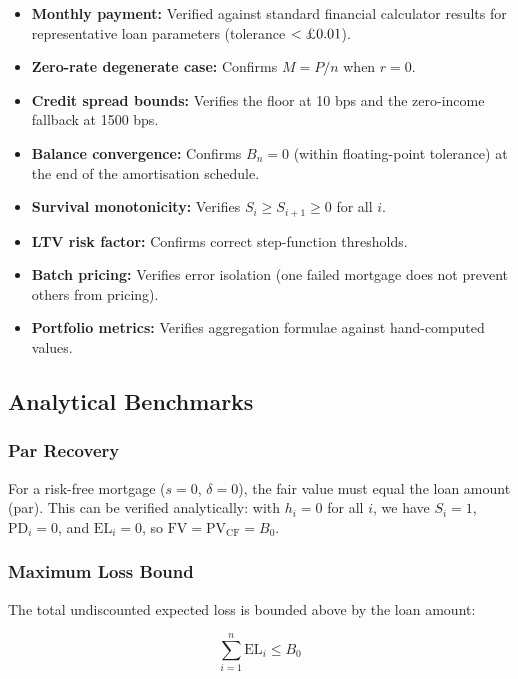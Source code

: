 \documentclass[11pt,a4paper]{article}
\begin{document}
\begin{itemize}[nosep]
    \item \textbf{Monthly payment:} Verified against standard financial calculator
          results for representative loan parameters (tolerance $< \text{\pounds}0.01$).
    \item \textbf{Zero-rate degenerate case:} Confirms $M = P/n$ when $r = 0$.
    \item \textbf{Credit spread bounds:} Verifies the floor at 10 bps and the
          zero-income fallback at 1500 bps.
    \item \textbf{Balance convergence:} Confirms $B_n = 0$ (within floating-point
          tolerance) at the end of the amortisation schedule.
    \item \textbf{Survival monotonicity:} Verifies $S_i \geq S_{i+1} \geq 0$ for all $i$.
    \item \textbf{LTV risk factor:} Confirms correct step-function thresholds.
    \item \textbf{Batch pricing:} Verifies error isolation (one failed mortgage does not
          prevent others from pricing).
    \item \textbf{Portfolio metrics:} Verifies aggregation formulae against hand-computed
          values.
\end{itemize}

\subsection{Analytical Benchmarks}

\subsubsection{Par Recovery}

For a risk-free mortgage ($s = 0$, $\delta = 0$), the fair value must equal the loan
amount (par). This can be verified analytically: with $h_i = 0$ for all $i$, we have
$S_i = 1$, $\text{PD}_i = 0$, and $\text{EL}_i = 0$, so $\text{FV} = \text{PV}_{\text{CF}} = B_0$.

\subsubsection{Maximum Loss Bound}

The total undiscounted expected loss is bounded above by the loan amount:

\begin{equation}
\sum_{i=1}^{n} \text{EL}_i \leq B_0
\end{equation}
\end{document}

